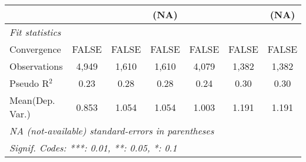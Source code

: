 \begin{tabular}{lcccccc}
                                                                              &                        &                        & (NA)                   &                        &                        & (NA)\\   
   \midrule
   \emph{Fit statistics}\\
   Convergence                                                                &FALSE                   & FALSE                  & FALSE                  & FALSE                  & FALSE                  & FALSE\\  
   Observations                                                               & 4,949                  & 1,610                  & 1,610                  & 4,079                  & 1,382                  & 1,382\\  
   Pseudo R$^2$                                                               & 0.23                   & 0.28                   & 0.28                   & 0.24                   & 0.30                   & 0.30\\  
Mean(Dep. Var.) & 0.853 & 1.054 & 1.054 & 1.003 & 1.191 & 1.191 \\
   \midrule \midrule
   \multicolumn{7}{l}{\emph{NA (not-available) standard-errors in parentheses}}\\
   \multicolumn{7}{l}{\emph{Signif. Codes: ***: 0.01, **: 0.05, *: 0.1}}\\
\end{tabular}
\par\endgroup
